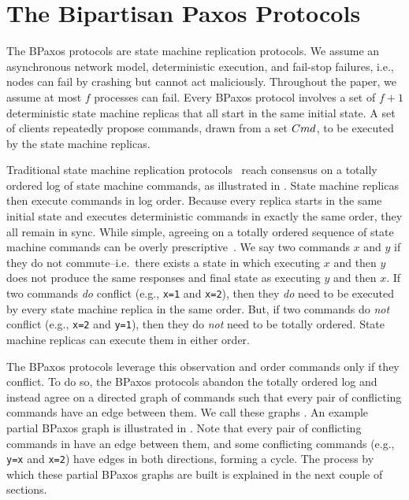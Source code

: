 \section{The Bipartisan Paxos Protocols}
The BPaxos protocols are state machine replication protocols. We assume an
asynchronous network model, deterministic execution, and fail-stop failures,
i.e., nodes can fail by crashing but cannot act maliciously. Throughout the
paper, we assume at most $f$ processes can fail. Every BPaxos protocol involves
a set of $f + 1$ deterministic state machine replicas that all start in the
same initial state. A set of clients repeatedly propose commands, drawn from a
set $Cmd$, to be executed by the state machine replicas.



Traditional state machine replication protocols~\cite{liskov2012viewstamped,
lamport1998part} reach consensus on a totally ordered log of state machine
commands, as illustrated in . State machine replicas then
execute commands in log order. Because every replica starts in the same initial
state and executes deterministic commands in exactly the same order,
they all remain in sync.
%
While simple, agreeing on a totally ordered sequence of state machine commands
can be overly prescriptive~\cite{lamport2005generalized, moraru2013there}. We
say two commands $x$ and $y$  if they do not commute--i.e.\
there exists a state in which executing $x$ and then $y$ does not produce the
same responses and final state as executing $y$ and then $x$. If two commands
\emph{do} conflict (e.g., \texttt{x=1} and \texttt{x=2}), then they \emph{do}
need to be executed by every state machine replica in the same order.  But, if
two commands do \emph{not} conflict (e.g., \texttt{x=2} and \texttt{y=1}), then
they do \emph{not} need to be totally ordered. State machine replicas can
execute them in either order.

The BPaxos protocols leverage this observation and order commands only if they
conflict. To do so, the BPaxos protocols abandon the totally ordered log and
instead agree on a directed graph of commands such that every pair of
conflicting commands have an edge between them. We call these graphs
\defword{partial BPaxos graphs}. An example partial BPaxos graph is illustrated
in . Note that every pair of conflicting commands in
\figref{BPaxosSMR} have an edge between them, and some conflicting commands
(e.g., \texttt{y=x} and \texttt{x=2}) have edges in both directions, forming a
cycle. The process by which these partial BPaxos graphs are built is explained
in the next couple of sections.

